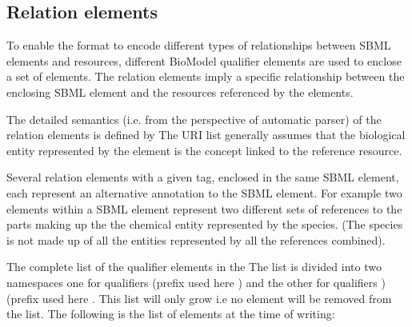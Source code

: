 \subsection{Relation elements}
\label{sec:qualified-dc-annotation}

To enable the format to encode different types of relationships
between SBML elements and resources, different BioModel qualifier
elements are used to enclose a set of  elements. The
relation elements imply a specific relationship between the
enclosing SBML element and the resources referenced by the
 elements.

The detailed semantics (i.e. from the perspective of automatic
parser) of the relation elements is defined by  The URI list generally assumes that the biological
entity represented by the element is the concept linked to the
reference resource.

Several relation elements with a given tag, enclosed in the same
SBML element, each represent an alternative annotation to the SBML
element. For example two  elements within a
\Species SBML element represent two different sets of
references to the parts making up the the chemical entity
represented by the species. (The species is not made up of all the
entities represented by all the references combined).

The complete list of the qualifier elements in the  The list is
divided into two namespaces one for  qualifiers
 (prefix used here
) and the other for  qualifiers
) (prefix used here
\changed{)}.  This list will only grow i.e no element will be
removed from the list. The following is the list of elements at
the time of writing:


